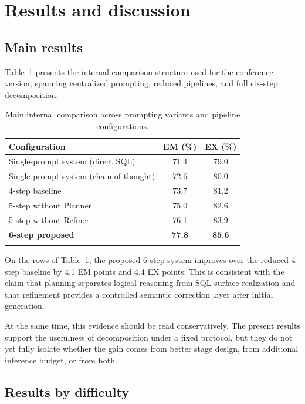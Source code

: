 \section{Results and discussion}\label{sec:results}

\subsection{Main results}\label{subsec:mainres}

Table~\ref{tab:main} presents the internal comparison structure used for the conference version, spanning centralized prompting, reduced pipelines, and full six-step decomposition.

\begin{table}[t]
\caption{Main internal comparison across prompting variants and pipeline configurations.}\label{tab:main}%
\centering
\begin{tabular}{@{}lcc@{}}
\toprule
Configuration & EM (\%) & EX (\%) \\
\midrule
Single-prompt system (direct SQL) & 71.4 & 79.0 \\
Single-prompt system (chain-of-thought) & 72.6 & 80.0 \\
4-step baseline & 73.7 & 81.2 \\
5-step without Planner & 75.0 & 82.6 \\
5-step without Refiner & 76.1 & 83.9 \\
\textbf{6-step proposed} & \textbf{77.8} & \textbf{85.6} \\
\botrule
\end{tabular}
\end{table}

On the rows of Table~\ref{tab:main}, the proposed 6-step system improves over the reduced 4-step baseline by 4.1 EM points and 4.4 EX points. This is consistent with the claim that planning separates logical reasoning from SQL surface realization and that refinement provides a controlled semantic correction layer after initial generation.

At the same time, this evidence should be read conservatively. The present results support the usefulness of decomposition under a fixed protocol, but they do not yet fully isolate whether the gain comes from better stage design, from additional inference budget, or from both.

\subsection{Results by difficulty}\label{subsec:diff}


